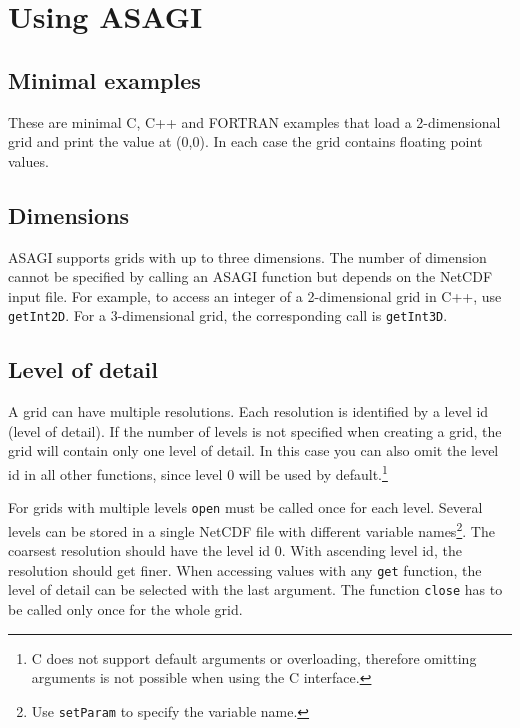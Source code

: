 \section{Using ASAGI}

\subsection{Minimal examples}

These are minimal C, C++ and FORTRAN examples that load a 2-dimensional grid and print the value at (0,0). In each case the grid contains floating point values.







\subsection{Dimensions}

ASAGI supports grids with up to three dimensions. The number of dimension cannot be specified by calling an ASAGI function but depends on the NetCDF input file. For example, to access an integer of a 2-dimensional grid in C++, use \texttt{getInt2D}. For a 3-dimensional grid, the corresponding call is \texttt{getInt3D}.

\subsection{Level of detail}

A grid can have multiple resolutions. Each resolution is identified by a level id (level of detail). If the number of levels is not specified when creating a grid, the grid will contain only one level of detail. In this case you can also omit the level id in all other functions, since level 0 will be used by default.\footnote{C does not support default arguments or overloading, therefore omitting arguments is not possible when using the C interface.}

For grids with multiple levels \texttt{open} must be called once for each level. Several levels can be stored in a single NetCDF file with different variable names\footnote{Use \texttt{setParam} to specify the variable name.}. The coarsest resolution should have the level id 0. With ascending level id, the resolution should get finer. When accessing values with any \texttt{get} function, the level of detail can be selected with the last argument. The function \texttt{close} has to be called only once for the whole grid.

